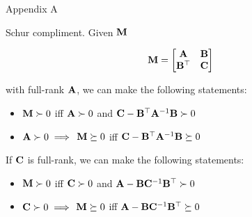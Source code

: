 \documentclass{beamer}
\begin{document}
\begin{frame}{Appendix A}
	\begin{flushleft}
		
		Schur compliment. Given $\mathbf{M}$
		
		\begin{equation}
			\mathbf{M} = 
			\begin{bmatrix}
				\mathbf{A} & \mathbf{B} \\
				\mathbf{B}^\top & \mathbf{C}
			\end{bmatrix}
		\end{equation}
	
	with full-rank $\mathbf{A}$, we can make the following statements:
	
	\begin{itemize}
		\item $\mathbf{M} \succ 0$ iff $\mathbf{A} \succ 0$ and $\mathbf{C} - \mathbf{B}^\top\mathbf{A}^{-1}\mathbf{B} \succ 0$
		\item $\mathbf{A} \succ 0 \implies$ $\mathbf{M} \succeq 0$ iff $\mathbf{C} - \mathbf{B}^\top\mathbf{A}^{-1}\mathbf{B} \succeq 0$
	\end{itemize}

\bigskip

	If $\mathbf{C}$ is full-rank, we can make the following statements:
	
	\begin{itemize}
	\item $\mathbf{M} \succ 0$ iff $\mathbf{C} \succ 0$ and $\mathbf{A} - \mathbf{B}\mathbf{C}^{-1}\mathbf{B}^\top \succ 0$
	\item $\mathbf{C} \succ 0 \implies$ $\mathbf{M} \succeq 0$ iff $\mathbf{A} - \mathbf{B}\mathbf{C}^{-1}\mathbf{B}^\top \succeq 0$
\end{itemize}		
		
		
		
	\end{flushleft}
\end{frame}
\end{document}
